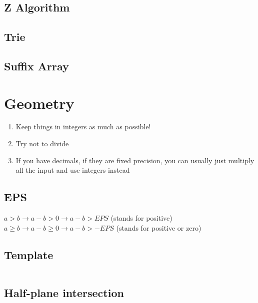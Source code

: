 \documentclass[10pt,oneside]{article}
\begin{document}
\begin{landscape}
\begin{multicols}{2}
\subsection{Z Algorithm}

\subsection{Trie}



\subsection{Suffix Array}


\section{Geometry}

\begin{enumerate}
	\item Keep things in integers as much as possible!
	\item Try not to divide
	\item If you have decimals, if they are fixed precision, you can usually just multiply all the input and use integers instead
\end{enumerate}

\subsection{EPS}

$a > b \rightarrow a - b > 0 \rightarrow a - b > EPS$ (stands for positive)\\
$a \geq b \rightarrow  a - b \geq 0 \rightarrow a - b > -EPS$ (stands for positive or zero)\\

\subsection{Template}

% 


\begin{lstlisting}

\end{lstlisting}

\subsection{Half-plane intersection}

\end{multicols}
\end{landscape}
\end{document}
